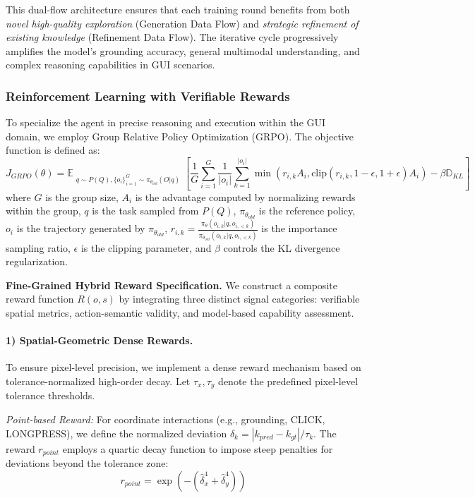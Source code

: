 This dual-flow architecture ensures that each training round benefits from both \textit{novel high-quality exploration} (Generation Data Flow) and \textit{strategic refinement of existing knowledge} (Refinement Data Flow). The iterative cycle progressively amplifies the model's grounding accuracy, general multimodal understanding, and complex reasoning capabilities in GUI scenarios.

\subsubsection{Reinforcement Learning with Verifiable Rewards}
To specialize the agent in precise reasoning and execution within the GUI domain, we employ Group Relative Policy Optimization (GRPO). The objective function is defined as:
\begin{equation}
J_{GRPO}(\theta) = \mathbb{E}_{\substack{q \sim P(Q), \{o_i\}_{i=1}^G \sim \pi_{\theta_{old}}(O|q)}} \left[ \frac{1}{G} \sum_{i=1}^G \frac{1}{|o_i|} \sum_{k=1}^{|o_i|} \min \left( r_{i,k} A_i, \text{clip}(r_{i,k}, 1-\epsilon, 1+\epsilon) A_i \right) - \beta \mathbb{D}_{KL} \right]
\label{equ: grpo}
\end{equation}
\noindent where $G$ is the group size, $A_i$ is the advantage computed by normalizing rewards within the group, $q$ is the task sampled from $P(Q)$, $\pi_{\theta_{old}}$ is the reference policy, $o_i$ is the trajectory generated by $\pi_{\theta_{old}}$, $r_{i,k} = \frac{\pi_{\theta}(o_{i,k}|q,o_{i,<k})}{\pi_{\theta_{old}}(o_{i,k}|q,o_{i,<k})}$ is the importance sampling ratio, $\epsilon$ is the clipping parameter, and $\beta$ controls the KL divergence regularization.


\noindent\textbf{Fine-Grained Hybrid Reward Specification.}
We construct a composite reward function $R(o, s)$ by integrating three distinct signal categories: verifiable spatial metrics, action-semantic validity, and model-based capability assessment.

\paragraph{1) Spatial-Geometric Dense Rewards.}
To ensure pixel-level precision, we implement a dense reward mechanism based on tolerance-normalized high-order decay. Let $\tau_x, \tau_y$ denote the predefined pixel-level tolerance thresholds.

\noindent\textit{Point-based Reward:} For coordinate interactions (e.g., grounding, CLICK, LONGPRESS), we define the normalized deviation $\hat{\delta}_k = |k_{pred} - k_{gt}| / \tau_k$. The reward $r_{point}$ employs a quartic decay function to impose steep penalties for deviations beyond the tolerance zone:
\begin{equation}
    r_{point} = \exp \left( - \left( \hat{\delta}_x^4 + \hat{\delta}_y^4 \right) \right)
\end{equation}

